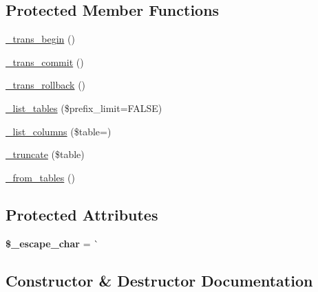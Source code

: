 \subsection*{Protected Member Functions}
\begin{DoxyCompactItemize}
\item 
\mbox{\hyperlink{class_c_i___d_b__pdo__mysql__driver_a6616451139c0bbcdadcf9bf1a268cf94}{\+\_\+trans\+\_\+begin}} ()
\item 
\mbox{\hyperlink{class_c_i___d_b__pdo__mysql__driver_a69a5aeef5cf6778118bcf821db4f2675}{\+\_\+trans\+\_\+commit}} ()
\item 
\mbox{\hyperlink{class_c_i___d_b__pdo__mysql__driver_aa02d540079eb2b8fa025dcdecdef38e3}{\+\_\+trans\+\_\+rollback}} ()
\item 
\mbox{\hyperlink{class_c_i___d_b__pdo__mysql__driver_ae4283cbd0dfd9d662baaac23852c1d37}{\+\_\+list\+\_\+tables}} (\$prefix\+\_\+limit=F\+A\+L\+SE)
\item 
\mbox{\hyperlink{class_c_i___d_b__pdo__mysql__driver_abbb2f9f35645c5f93851abacadfc92b1}{\+\_\+list\+\_\+columns}} (\$table=\textquotesingle{}\textquotesingle{})
\item 
\mbox{\hyperlink{class_c_i___d_b__pdo__mysql__driver_a6549334c535d1a3fe1b74348da30c7cf}{\+\_\+truncate}} (\$table)
\item 
\mbox{\hyperlink{class_c_i___d_b__pdo__mysql__driver_a98192a1024074e9dd8722706e2dc1f96}{\+\_\+from\+\_\+tables}} ()
\end{DoxyCompactItemize}
\subsection*{Protected Attributes}
\begin{DoxyCompactItemize}
\item 
\mbox{\label{class_c_i___d_b__pdo__mysql__driver_a2894af6620c378f412c8663ae542e245}} 
{\bfseries \$\+\_\+escape\+\_\+char} = \textquotesingle{}\`{}\textquotesingle{}
\end{DoxyCompactItemize}


\subsection{Constructor \& Destructor Documentation}
\mbox{\label{class_c_i___d_b__pdo__mysql__driver_a59b7088e50363395c71c40204ffb7733}} 
